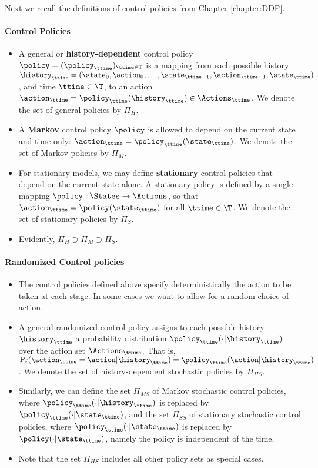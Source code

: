 Next we recall the definitions of control policies from Chapter \ref{chapter:DDP}.

\paragraph{Control Policies}
\begin{itemize}
  \item A general or \textbf{history-dependent} control policy $\policy  = {({\policy _\ttime})_{\ttime \in {\mathbb{T}}}}$ is a mapping from each possible history ${\history_\ttime} = ({\state_0},{\action_0}, \ldots ,{\state_{\ttime - 1}},{\action_{\ttime - 1}},{\state_\ttime})$, and time $\ttime \in \T$, to an action ${\action_\ttime} = {\policy _\ttime}({\history_\ttime}) \in {\Actions_\ttime}$.  We denote the set of general policies by ${\Pi _H}$.
  \item A \textbf{Markov} control policy $\policy $ is allowed to depend on the current state and time only: ${\action_\ttime} = {\policy _\ttime}({\state_\ttime})$.   We denote the set of Markov policies by ${\Pi _M}$.
  \item For stationary models, we may define \textbf{stationary} control policies that depend on the current state alone. A stationary policy is defined by a single mapping $\policy :\States \to \Actions$, so that  ${\action_\ttime} = \policy ({\state_\ttime})$ for all $\ttime \in {\T}$. We denote the set of stationary policies by ${\Pi _S}$.
  \item Evidently, ${\Pi _H} \supset {\Pi _M} \supset {\Pi _S}$.
\end{itemize}

\paragraph{Randomized Control policies}
\begin{itemize}
  \item The control policies defined above specify deterministically the action to be taken at each stage. In some cases we want to allow for a random choice of action.
  \item A general randomized control policy assigns to each possible history ${\history_\ttime}$ a probability distribution ${\policy _\ttime}( \cdot |{\history_\ttime})$ over the action set ${\Actions_\ttime}$.
  That is,  $\Pr( {\action_\ttime} = \action|{\history_\ttime})  = {\policy _\ttime}(\action|{\history_\ttime})$. We denote the set of history-dependent stochastic policies by ${\Pi _{HS}}$.
  \item Similarly, we can define the set ${\Pi _{MS}}$ of Markov stochastic control policies, where ${\policy _\ttime}( \cdot |{\history_\ttime})$ is replaced by ${\policy _\ttime}( \cdot |{\state_\ttime})$, and the set ${\Pi _{SS}}$ of stationary stochastic control policies, where ${\policy _\ttime}( \cdot |{\state_\ttime})$ is replaced by  $\policy ( \cdot
  |{\state_\ttime})$, namely the policy is independent of the time.
  \item Note that the set ${\Pi _{HS}}$ includes all other policy sets as special cases.
\end{itemize}

